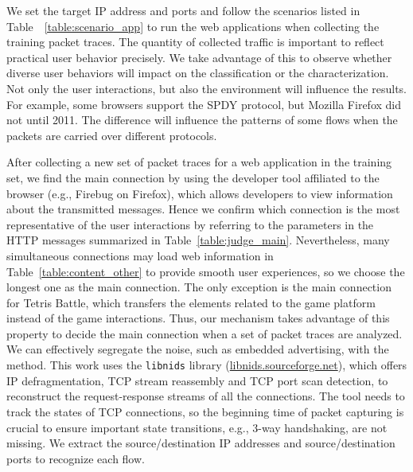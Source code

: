 We set the target IP address and ports and follow the scenarios listed in Table~~\ref{table:scenario_app} to run the web applications when collecting the training packet traces. The quantity of collected traffic is important to reflect practical user behavior precisely. We take advantage of this to observe whether diverse user behaviors will impact on the classification or the characterization. Not only the user interactions, but also the environment will influence the results. For example, some browsers support the SPDY protocol, but Mozilla Firefox did not until 2011. The difference will influence the patterns of some flows when the packets are carried over different protocols.

After collecting a new set of packet traces for a web application in the training set, we find the main connection by using the developer tool affiliated to the browser (e.g., Firebug on Firefox), which allows developers to view information about the transmitted messages. Hence we confirm which connection is the most representative of the user interactions by referring to the parameters in the HTTP messages summarized in Table~\ref{table:judge_main}. Nevertheless, many simultaneous connections may load web information in Table~\ref{table:content_other} to provide smooth user experiences, so we choose the longest one as the main connection. The only exception is the main connection for Tetris Battle, which transfers the elements related to the game platform instead of the game interactions. Thus, our mechanism takes advantage of this property to decide the main connection when a set of packet traces are analyzed. We can effectively segregate the noise, such as embedded advertising, with the method. This work uses the \texttt{libnids} library (\url{libnids.sourceforge.net}), which offers IP defragmentation, TCP stream reassembly and TCP port scan detection, to reconstruct the request-response streams of all the connections. The tool needs to track the states of TCP connections, so the beginning time of packet capturing is crucial to ensure important state transitions, e.g., 3-way handshaking, are not missing. We extract the source/destination IP addresses and source/destination ports to recognize each flow.




